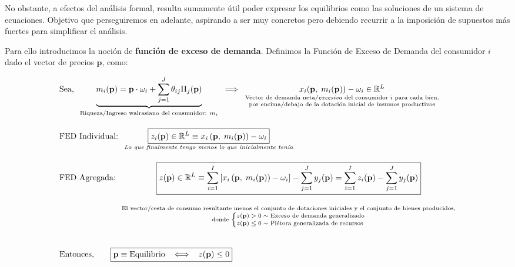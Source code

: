 \documentclass[10pt,a4paper]{article}
\begin{document}
No obstante, a efectos del análisis formal, resulta sumamente útil poder expresar los equilibrios como las soluciones de un sistema de ecuaciones. Objetivo que perseguiremos en adelante, aspirando a ser muy concretos pero debiendo recurrir a la imposición de supuestos más fuertes para simplificar el análisis.

Para ello introducimos la noción de \textbf{función de exceso de demanda}. Definimos la Función de Exceso de Demanda del consumidor $i$ dado el vector de precios $\mathbf p$, como:

$$\begin{aligned}
    &\text{Sea,}\;\;\underbrace{m_i(\mathbf p)=\mathbf p\cdot \omega_i+\sum_{j=1}^J\theta_{ij}\Pi_j(\mathbf p)}_{\text{\scriptsize Riqueza/Ingreso walrasiano del consumidor: $m_i$}}\;\;\Longrightarrow\;\;\underset{\substack{\text{\scriptsize Vector de demanda neta/\textit{excesiva} del consumidor $i$ para cada bien,}\\\text{\scriptsize por encima/debajo de la dotación inicial de insumos productivos}}}{x_i(\mathbf p,\;m_i(\mathbf p))-\omega_i\in \mathbb R^L}\\[1em]
    &\text{FED Individual: }\;\underset{\text{\scriptsize \textit{Lo que finalmente tengo menos lo que inicialmente tenía}}}{\boxed{z_i(\mathbf p)\in\mathbb R^L\equiv x_i\left(\mathbf p,\;m_i(\mathbf p)\right)-\omega_i}}\\[1em]
    &\text{FED Agregada: }\;\underset{\substack{\\[0.5em]\\\text{\scriptsize El vector/cesta de consumo resultante menos el conjunto de dotaciones iniciales y el conjunto de bienes producidos,}\\\text{\scriptsize donde 
    $\left\{\begin{aligned}
        &z(\mathbf p)>0\sim \text{Exceso de demanda generalizado}\\
        &z(\mathbf p)\leq0 \sim \text{Plétora generalizada de recursos}
    \end{aligned}\right.$}}}{\boxed{z(\mathbf p)\in\mathbb R^L\equiv \sum_{i=1}^I\left[x_i\left(\mathbf p,\;m_i(\mathbf p)\right)-\omega_i\right]-\sum_{j=1}^Jy_j(\mathbf p)=\sum_{i=1}^Iz_i(\mathbf p)-\sum_{j=1}^Jy_j(\mathbf p)}}\\[2em]
    &\text{Entonces,}\qquad \boxed{\mathbf p\equiv \text{Equilibrio}\;\;\iff\;\;z(\mathbf p)\leq 0}
\end{aligned}$$
\end{document}
